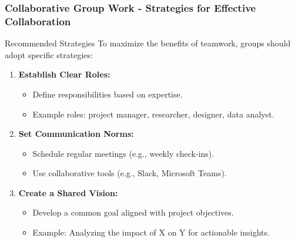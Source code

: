 \documentclass[aspectratio=169]{beamer}
\begin{document}
\begin{frame}[fragile]
    \frametitle{Collaborative Group Work - Strategies for Effective Collaboration}
    \begin{block}{Recommended Strategies}
        To maximize the benefits of teamwork, groups should adopt specific strategies:
    \end{block}

    \begin{enumerate}
        \item \textbf{Establish Clear Roles:}
            \begin{itemize}
                \item Define responsibilities based on expertise.
                \item Example roles: project manager, researcher, designer, data analyst.
            \end{itemize}
        \item \textbf{Set Communication Norms:}
            \begin{itemize}
                \item Schedule regular meetings (e.g., weekly check-ins).
                \item Use collaborative tools (e.g., Slack, Microsoft Teams).
            \end{itemize}
        \item \textbf{Create a Shared Vision:}
            \begin{itemize}
                \item Develop a common goal aligned with project objectives.
                \item Example: Analyzing the impact of X on Y for actionable insights.
            \end{itemize}
    \end{enumerate}
\end{frame}
\end{document}
